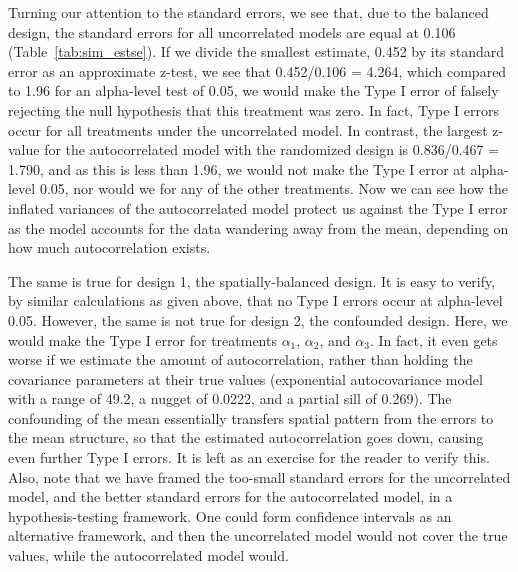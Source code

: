 \documentclass[12pt, titlepage]{article}
\begin{document}
Turning our attention to the standard errors, we see that, due to the balanced design, the standard errors for all uncorrelated models are equal at 0.106 (Table~\ref{tab:sim_estse}).  If we divide the smallest estimate, 0.452 by its standard error as an approximate z-test, we see that 0.452/0.106 = 4.264, which compared to 1.96 for an alpha-level test of 0.05, we would make the Type I error of falsely rejecting the null hypothesis that this treatment was zero.  In fact, Type I errors occur for all treatments under the uncorrelated model.  In contrast, the largest z-value for the autocorrelated model with the randomized design is 0.836/0.467 = 1.790, and as this is less than 1.96, we would not make the Type I error at alpha-level 0.05, nor would we for any of the other treatments.  Now we can see how the inflated variances of the autocorrelated model protect us against the Type I error as the model accounts for the data wandering away from the mean, depending on how much autocorrelation exists.

The same is true for design 1, the spatially-balanced design.  It is easy to verify, by similar calculations as given above, that no Type I errors occur at alpha-level 0.05.  However, the same is not true for design 2, the confounded design.  Here, we would make the Type I error for treatments $\alpha_{1}$, $\alpha_{2}$, and $\alpha_{3}$.  In fact, it even gets worse if we estimate the amount of autocorrelation, rather than holding the covariance parameters at their true values (exponential autocovariance model with a range of 49.2, a nugget of 0.0222, and a partial sill of 0.269).  The confounding of the mean essentially transfers spatial pattern from the errors to the mean structure, so that the estimated autocorrelation goes down, causing even further Type I errors.  It is left as an exercise for the reader to verify this.  Also, note that we have framed the too-small standard errors for the uncorrelated model, and the better standard errors for the autocorrelated model, in a hypothesis-testing framework.  One could form confidence intervals as an alternative framework, and then the uncorrelated model would not cover the true values, while the autocorrelated model would.
\end{document}
